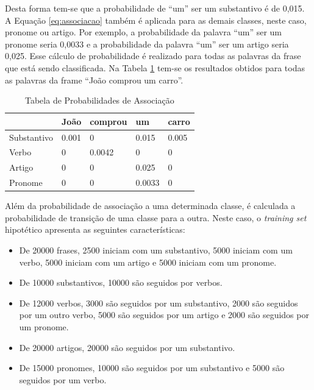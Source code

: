 Desta forma tem-se que a probabilidade de ``um'' ser um substantivo é de 0,015.
A Equação \ref{eq:associacao} também é aplicada para as demais classes,
neste caso, pronome ou artigo. Por exemplo, a probabilidade da palavra ``um'' ser um pronome
seria 0,0033 e a probabilidade da palavra ``um'' ser um artigo seria 0,025. Esse
cálculo de probabilidade é realizado para todas as palavras da frase que está
sendo classificada. Na Tabela \ref{tabela:associacao} tem-se os resultados
obtidos para todas as palavras da frame ``João comprou um carro''.

\begin{table}[htb]
\centering
\begin{tabular}{|l|l|l|l|l|}
\hline
& João  & comprou & um     & carro  \\ \hline
Substantivo & 0.001 & 0       & 0.015  & 0.005  \\ \hline
Verbo       & 0     & 0.0042  & 0      & 0      \\ \hline
Artigo      & 0     & 0       & 0.025  & 0      \\ \hline
Pronome     & 0     & 0       & 0.0033 & 0      \\ \hline
\end{tabular}
\caption{Tabela de Probabilidades de Associação}
\label{tabela:associacao}
\end{table}

Além da probabilidade de associação a uma determinada classe, é calculada a
probabilidade de transição de uma classe para a outra. Neste caso, o
\textit{training set} hipotético apresenta as seguintes características:

\begin{itemize}
  \item De 20000 frases, 2500 iniciam com um substantivo, 5000 iniciam com um
  verbo, 5000 iniciam com um artigo e 5000 iniciam com um pronome.
  \item De 10000 substantivos, 10000
  são seguidos por verbos.
  \item De 12000 verbos, 3000 são seguidos por um substantivo, 2000
  são seguidos por um outro verbo, 5000 são seguidos por um artigo e 2000 são
  seguidos por um pronome.
  \item De 20000 artigos, 20000 são seguidos por um substantivo.
  \item De 15000 pronomes, 10000 são seguidos por um substantivo e 5000 são
  seguidos por um verbo.
  
  
\end{itemize}

